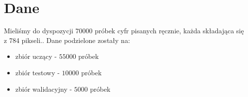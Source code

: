 \chapter{Dane}
Mieliśmy do dyspozycji $70000$ próbek cyfr pisanych ręcznie, każda składająca się z 784 pikseli.. Dane podzielone zostały na:
\begin{itemize}
\item zbiór uczący - $55000$ próbek
\item zbiór testowy - $10000$ próbek
\item zbiór walidacyjny - $5000$ próbek
\end{itemize}